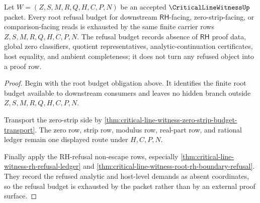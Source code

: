\begin{theorem}
\label{thm:critical-line-witness-root-refusal-budget-exhaustion}
Let $W=(Z,S,M,R,Q,H,C,P,N)$ be an accepted $\CriticalLineWitnessUp$ packet. Every root refusal budget for downstream $\mathsf{RH}$-facing, zero-strip-facing, or comparison-facing reads is exhausted by the same finite carrier rows $Z,S,M,R,Q,H,C,P,N$. The refusal budget records absence of $\mathsf{RH}$ proof data, global zero classifiers, quotient representatives, analytic-continuation certificates, host equality, and ambient completeness; it does not turn any refused object into a proof row.
\end{theorem}
\begin{proof}
Begin with the root budget obligation above. It identifies the finite root budget available to downstream consumers and leaves no hidden branch outside $Z,S,M,R,Q,H,C,P,N$.

Transport the zero-strip side by \autoref{thm:critical-line-witness-zero-strip-budget-transport}. The zero row, strip row, modulus row, real-part row, and rational ledger remain one displayed route under $H,C,P,N$.

Finally apply the RH-refusal non-escape rows, especially \autoref{thm:critical-line-witness-rh-refusal-ledger} and \autoref{thm:critical-line-witness-root-rh-boundary-refusal}. They record the refused analytic and host-level demands as absent coordinates, so the refusal budget is exhausted by the packet rather than by an external proof surface.
\end{proof}
